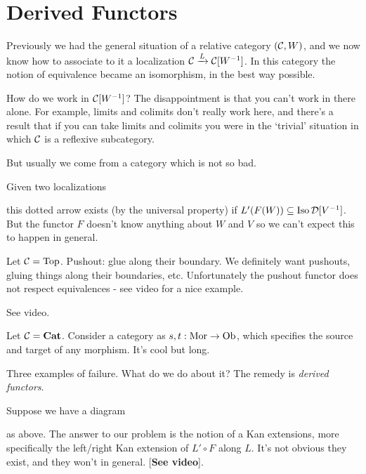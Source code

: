 \documentclass[../MH_Total.tex]{subfiles}
\begin{document}
\section{Derived Functors}
Previously we had the general situation of a relative category $(\mathcal{C},W)$, and we now know how to associate to it a localization $\mathcal{C} \xrightarrow{L} \mathcal{C}[W^{-1}]$. In this category the notion of equivalence became an isomorphism, in the best way possible.

How do we work in $\mathcal{C}[W^{-1}]$? The disappointment is that you can't work in there alone. For example, limits and colimits don't really work here, and there's a result that if you can take limits and colimits you were in the `trivial' situation in which $\mathcal{C}$ is a reflexive subcategory.

But usually we come from a category which is not so bad.

Given two localizations
\begin{center}
\end{center}
this dotted arrow exists (by the universal property) if $L'(F(W)) \subseteq \operatorname{Iso}\mathcal{D}[V^{-1}]$. But the functor $F$ doesn't know anything about $W$ and $V$ so we can't expect this to happen in general.

\begin{example}[(Colimits)]
	Let $\mathcal{C} = \operatorname{Top}$. Pushout: glue along their boundary. We definitely want pushouts, gluing things along their boundaries, etc. Unfortunately the pushout functor does not respect equivalences - see video for a nice example.
\end{example}

\begin{example}[(Limits)]
	See video.
\end{example}

\begin{example}
	Let $\mathcal{C} = \mathbf{Cat}$. Consider a category as $s,t: \operatorname{Mor} \to \operatorname{Ob}$, which specifies the source and target of any morphism. It's cool but long.
\end{example}

Three examples of failure. What do we do about it? The remedy is \emph{derived functors}. 

Suppose we have a diagram
\begin{center}
\end{center}
as above. The answer to our problem is the notion of a Kan extensions, more specifically the left/right Kan extension of $L' \circ F$ along $L$. It's not obvious they exist, and they won't in general. [\textbf{See video}]. 
\end{document}
